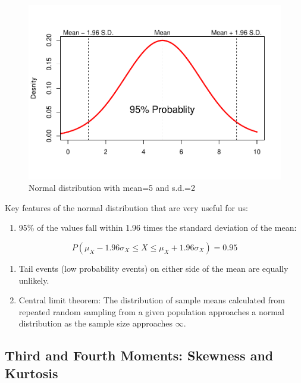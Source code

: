 \documentclass[]{book}
\providecommand{\tightlist}{%
  \setlength{\itemsep}{0pt}\setlength{\parskip}{0pt}}
\theoremstyle{definition}
\theoremstyle{definition}
\theoremstyle{definition}
\theoremstyle{remark}
\begin{document}
\begin{figure}

{\centering \includegraphics{bookdown-demo_files/figure-latex/unnamed-chunk-52-1} 

}

\caption{Normal distribution with mean=5 and s.d.=2}\label{fig:unnamed-chunk-52}
\end{figure}

Key features of the normal distribution that are very useful for us:

\begin{enumerate}
\def\labelenumi{\alph{enumi}.}
\tightlist
\item
  95\% of the values fall within 1.96 times the standard deviation of the mean:
\end{enumerate}

\[P(\mu_X -1.96\sigma_X \leq X \leq \mu_X + 1.96\sigma_X)=0.95\]

\begin{enumerate}
\def\labelenumi{\alph{enumi}.}
\setcounter{enumi}{1}
\item
  Tail events (low probability events) on either side of the mean are equally unlikely.
\item
  Central limit theorem: The distribution of sample means calculated from repeated random sampling from a given population approaches a normal distribution as the sample size approaches \(\infty\).
\end{enumerate}

\hypertarget{third-and-fourth-moments-skewness-and-kurtosis}{%
\subsection{Third and Fourth Moments: Skewness and Kurtosis}\label{third-and-fourth-moments-skewness-and-kurtosis}}
\end{document}
